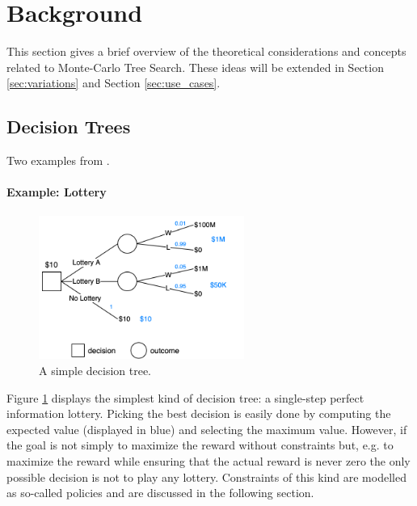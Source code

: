\section{Background}
\label{sec:background}
This section gives a brief overview of the theoretical considerations and concepts related to Monte-Carlo Tree Search. These ideas will be extended in Section \ref{sec:variations} and Section \ref{sec:use_cases}.
\subsection{Decision Trees}
\label{ss:decision_trees}
Two examples from \cite{fu2018monte}.
\paragraph{Example: Lottery}
\begin{figure}
    \centering
    \includegraphics[width=0.6\textwidth]{img/lottery.png}
    \caption{A simple decision tree.}
    \label{fig:lottery}
\end{figure}
Figure \ref{fig:lottery} displays the simplest kind of decision tree: a single-step perfect information lottery. Picking the best decision is easily done by computing the expected value (displayed in blue) and selecting the maximum value. However, if the goal is not simply to maximize the reward without constraints but, e.g. to maximize the reward while ensuring that the actual reward is never zero the only possible decision is not to play any lottery. Constraints of this kind are modelled as so-called policies and are discussed in the following section.
